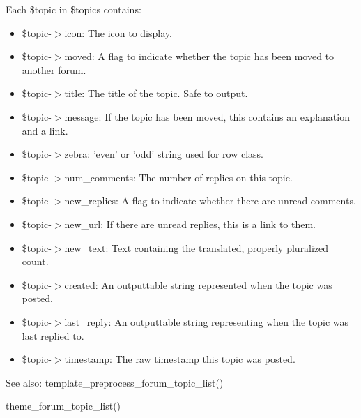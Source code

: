 Each \$topic in \$topics contains:\begin{itemize}
\item \$topic-$>$icon: The icon to display.\item \$topic-$>$moved: A flag to indicate whether the topic has been moved to another forum.\item \$topic-$>$title: The title of the topic. Safe to output.\item \$topic-$>$message: If the topic has been moved, this contains an explanation and a link.\item \$topic-$>$zebra: 'even' or 'odd' string used for row class.\item \$topic-$>$num\_\-comments: The number of replies on this topic.\item \$topic-$>$new\_\-replies: A flag to indicate whether there are unread comments.\item \$topic-$>$new\_\-url: If there are unread replies, this is a link to them.\item \$topic-$>$new\_\-text: Text containing the translated, properly pluralized count.\item \$topic-$>$created: An outputtable string represented when the topic was posted.\item \$topic-$>$last\_\-reply: An outputtable string representing when the topic was last replied to.\item \$topic-$>$timestamp: The raw timestamp this topic was posted.\end{itemize}


\begin{Desc}
\item[See also:]template\_\-preprocess\_\-forum\_\-topic\_\-list() 

theme\_\-forum\_\-topic\_\-list() \end{Desc}
